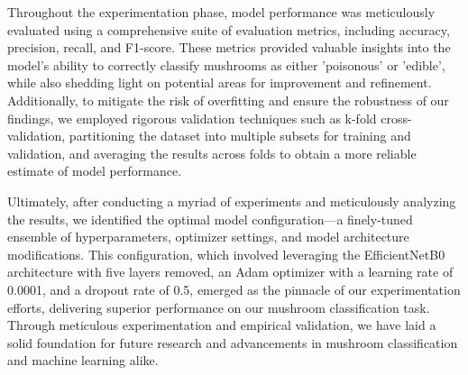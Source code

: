 Throughout the experimentation phase, model performance was meticulously evaluated using a comprehensive suite of evaluation metrics, including accuracy, precision, recall, and F1-score. These metrics provided valuable insights into the model's ability to correctly classify mushrooms as either 'poisonous' or 'edible', while also shedding light on potential areas for improvement and refinement. Additionally, to mitigate the risk of overfitting and ensure the robustness of our findings, we employed rigorous validation techniques such as k-fold cross-validation, partitioning the dataset into multiple subsets for training and validation, and averaging the results across folds to obtain a more reliable estimate of model performance.

Ultimately, after conducting a myriad of experiments and meticulously analyzing the results, we identified the optimal model configuration—a finely-tuned ensemble of hyperparameters, optimizer settings, and model architecture modifications. This configuration, which involved leveraging the EfficientNetB0 architecture with five layers removed, an Adam optimizer with a learning rate of 0.0001, and a dropout rate of 0.5, emerged as the pinnacle of our experimentation efforts, delivering superior performance on our mushroom classification task. Through meticulous experimentation and empirical validation, we have laid a solid foundation for future research and advancements in mushroom classification and machine learning alike.